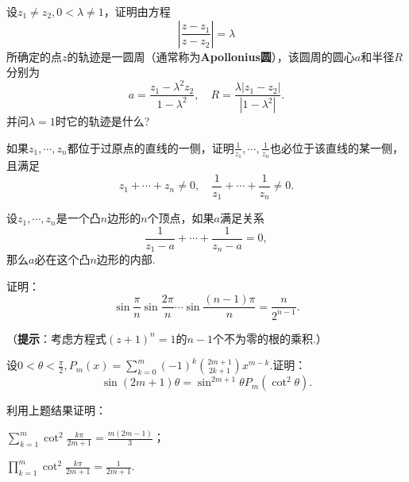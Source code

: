 \begin{xiti}
\begin{enuma}
   \end{enuma}
 \item \hypertarget{xiti1.2.15}{}设$z_1\ne z_2,0<\lambda\ne1$，证明由方程
     \[\left|\frac{z-z_1}{z-z_2}\right|=\lambda\]
 所确定的点$z$的轨迹是一圆周（通常称为\textbf{Apollonius圆}），该圆周的圆心$a$和半径$R$分别为
     \[a=\frac{z_1-\lambda^2z_2}{1-\lambda^2},\quad R=\frac{\lambda|z_1-z_2|}
     {|1-\lambda^2|}.\]
 并问$\lambda=1$时它的轨迹是什么?
 \item 如果$z_1,\cdots,z_n$都位于过原点的直线的一侧，证明$\frac1{z_1},\cdots,\frac1{z_n}$也必位于该直线的某一侧，且满足
     \[z_1+\cdots+z_n\ne0,\quad\frac1{z_1}+\cdots+\frac1{z_n}\ne0.\]
 \item 设$z_1,\cdots,z_n$是一个凸$n$边形的$n$个顶点，如果$a$满足关系
     \[\frac1{z_1-a}+\cdots+\frac1{z_n-a}=0,\]
 那么$a$必在这个凸$n$边形的内部.
 \item 证明：
     \[\sin\frac\pi n\sin\frac{2\pi}n\cdots\sin\frac{(n-1)\pi}n=\frac n{2^{n-1}}.\]

 （\textbf{提示}：考虑方程式$(z+1)^n=1$的$n-1$个不为零的根的乘积.）
 \item 设$0<\theta<\frac\pi2,P_m(x)=\sum_{k=0}^m(-1)^k\binom{2m+1}{2k+1}x^{m-k}$.证明：
   \[\sin(2m+1)\theta=\sin^{2m+1}\theta P_m(\cot^2\theta).\]
 \item 利用上题结果证明：
  \begin{enuma}
    \item $\sum_{k=1}^m\cot^2\frac{k\pi}{2m+1}=\frac{m(2m-1)}3$；
    \item $\prod_{k=1}^m\cot^2\frac{k\pi}{2m+1}=\frac1{2m+1}$.
  \end{enuma}
\end{xiti}

